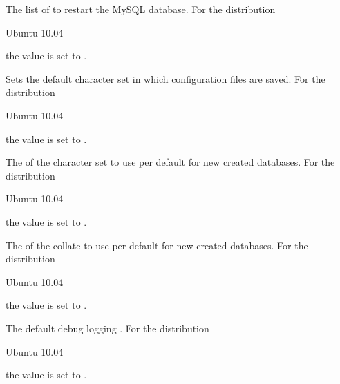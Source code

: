 The list of  to restart the MySQL database.
For the distribution
\begin{inparaitem}
\item[\TheDistribution{ubuntu}] Ubuntu 10.04
\end{inparaitem}
the value is set to .


Sets the default character set  in which configuration files are 
saved. For the distribution
\begin{inparaitem}
\item[\TheDistribution{ubuntu}] Ubuntu 10.04
\end{inparaitem}
the value is set to .


The  of the character set to use per default for new created databases.
For the distribution
\begin{inparaitem}
\item[\TheDistribution{ubuntu}] Ubuntu 10.04
\end{inparaitem}
the value is set to .


The  of the collate to use per default for new created databases.
For the distribution
\begin{inparaitem}
\item[\TheDistribution{ubuntu}] Ubuntu 10.04
\end{inparaitem}
the value is set to .
 

The default debug logging .
For the distribution
\begin{inparaitem}
\item[\TheDistribution{ubuntu}] Ubuntu 10.04
\end{inparaitem}
the value is set to .

